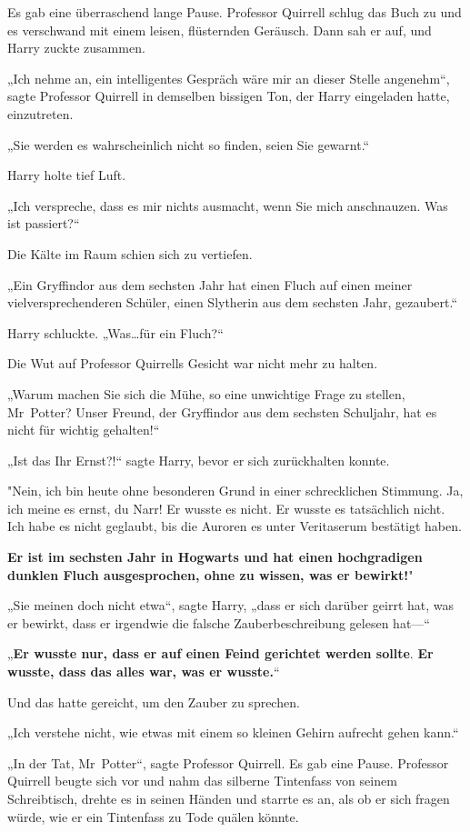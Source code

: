 {Es gab eine überraschend lange Pause. Professor Quirrell schlug das Buch zu und es verschwand mit einem leisen, flüsternden Geräusch. Dann sah er auf, und Harry zuckte zusammen.

„Ich nehme an, ein intelligentes Gespräch wäre mir an dieser Stelle angenehm“, sagte Professor Quirrell in demselben bissigen Ton, der Harry eingeladen hatte, einzutreten.

„Sie werden es wahrscheinlich nicht so finden, seien Sie gewarnt.“

Harry holte tief Luft.

„Ich verspreche, dass es mir nichts ausmacht, wenn Sie mich anschnauzen. Was ist passiert?“

Die Kälte im Raum schien sich zu vertiefen.

„Ein Gryffindor aus dem sechsten Jahr hat einen Fluch auf einen meiner vielversprechenderen Schüler, einen Slytherin aus dem sechsten Jahr, gezaubert.“

Harry schluckte. „Was…für ein Fluch?“

Die Wut auf Professor Quirrells Gesicht war nicht mehr zu halten.

„Warum machen Sie sich die Mühe, so eine unwichtige Frage zu stellen, Mr~Potter? Unser Freund, der Gryffindor aus dem sechsten Schuljahr, hat es nicht für wichtig gehalten!“

„Ist das Ihr Ernst?!“ sagte Harry, bevor er sich zurückhalten konnte.

"Nein, ich bin heute ohne besonderen Grund in einer schrecklichen Stimmung. Ja, ich meine es ernst, du Narr! Er wusste es nicht. Er wusste es tatsächlich nicht. Ich habe es nicht geglaubt, bis die Auroren es unter Veritaserum bestätigt haben.

\textbf{Er ist im sechsten Jahr in Hogwarts und hat einen hochgradigen dunklen Fluch ausgesprochen, ohne zu wissen, was er bewirkt!}"

„Sie meinen doch nicht etwa“, sagte Harry, „dass er sich darüber geirrt hat, was er bewirkt, dass er irgendwie die falsche Zauberbeschreibung gelesen hat—“

„\textbf{Er wusste nur, dass er auf einen Feind gerichtet werden sollte}. \textbf{Er wusste, dass das alles war, was er wusste.}“

Und das hatte gereicht, um den Zauber zu sprechen.

„Ich verstehe nicht, wie etwas mit einem so kleinen Gehirn aufrecht gehen kann.“

„In der Tat, Mr~Potter“, sagte Professor Quirrell. Es gab eine Pause. Professor Quirrell beugte sich vor und nahm das silberne Tintenfass von seinem Schreibtisch, drehte es in seinen Händen und starrte es an, als ob er sich fragen würde, wie er ein Tintenfass zu Tode quälen könnte.

}
